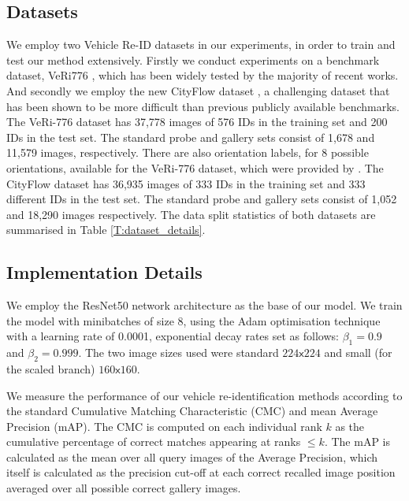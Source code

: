\documentclass[10pt,twocolumn,letterpaper]{article}
\def\x{{\mathsf x}}
\begin{document}
\subsection{Datasets}
We employ two Vehicle Re-ID datasets in our experiments, in order to train and test our method extensively. Firstly we conduct experiments on a benchmark dataset, VeRi776 \cite{liu2016veri}, which has been widely tested by the majority of recent works. And secondly we employ the new CityFlow dataset \cite{tang2019cityflow}, a challenging dataset that has been shown to be more difficult than previous publicly available benchmarks.
%
The VeRi-776 dataset \cite{liu2016veri} has 37,778 images of 576 IDs in the training set and 200
IDs in the test set. The standard probe and gallery sets consist of 1,678 and 11,579
images, respectively. There are also orientation labels, for 8 possible orientations, available for the VeRi-776 dataset, which were provided by \cite{Wang_2017_ICCV}.
%
%
The CityFlow dataset \cite{tang2019cityflow} has 36,935 images of 333 IDs in the training set and 333 different IDs in the test set. The standard probe and gallery sets consist of 1,052 and 18,290 images respectively.
The data split statistics of both datasets are summarised in Table \ref{T:dataset_details}.

\subsection{Implementation Details}
We employ the ResNet50 \cite{he2016deep} network
architecture as the base of our model. We train the model with
minibatches of size 8, using the Adam optimisation technique with a
learning rate of 0.0001, exponential decay rates set as follows:
$\beta_1=0.9$ and $\beta_2=0.999$. The two image sizes used were
standard $224\x224$ and small (for the scaled branch) $160\x160$.

We measure the performance of our vehicle re-identification methods according to the standard Cumulative Matching Characteristic (CMC) and mean Average Precision (mAP). The CMC is computed on each individual rank $k$ as the cumulative percentage of correct matches appearing
at ranks $\leq k$. The mAP is calculated as the mean over all query images of the Average Precision, which itself is calculated as the precision cut-off at each correct recalled image position averaged over all possible correct gallery images.
\end{document}
